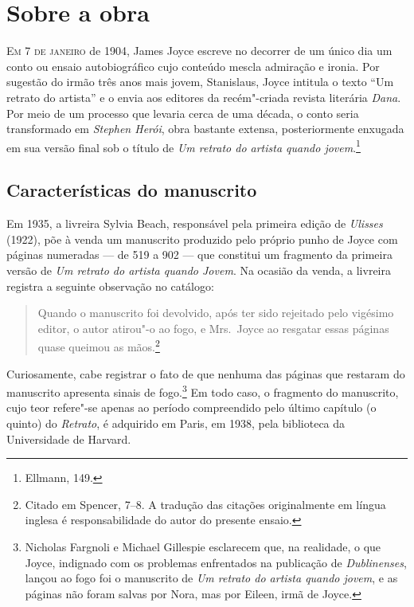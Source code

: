 \section{Sobre a obra}

\textsc{Em 7 de janeiro} de 1904, James Joyce escreve no decorrer de um único dia
um conto ou ensaio autobiográfico cujo conteúdo mescla admiração e
ironia.  Por sugestão do irmão três anos mais jovem, Stanislaus, Joyce
intitula o texto “Um retrato do artista” e o envia aos editores da
recém"-criada revista literária \textit{Dana}.  Por meio de um processo
que levaria  cerca de uma década, o conto seria transformado em
\textit{Stephen Herói}, obra bastante extensa, posteriormente enxugada
em sua versão final sob o título de \textit{Um retrato do artista
quando jovem}.\footnote{ Ellmann, 149.}		


\subsection*{Características do manuscrito}

Em 1935, a livreira Sylvia Beach, responsável pela primeira edição de
\textit{Ulisses} (1922), põe à venda um manuscrito produzido pelo
próprio punho de Joyce com páginas numeradas --- de 519 a 902 --- que
constitui um fragmento da primeira versão de \textit{Um retrato do
artista quando Jovem}.  Na ocasião da venda, a livreira registra a
seguinte observação no catálogo: 

\begin{quote}
Quando o manuscrito foi devolvido,
após ter sido rejeitado pelo vigésimo editor, o autor atirou"-o ao fogo,
e Mrs.~Joyce ao resgatar essas páginas quase queimou as mãos.\footnote{
Citado em Spencer, 7--8. A tradução das citações originalmente em
língua inglesa é responsabilidade do autor do presente ensaio.} 
\end{quote}

Curiosamente, cabe registrar o fato de que nenhuma das páginas que
restaram do manuscrito apresenta sinais de fogo.\footnote{ Nicholas Fargnoli e Michael Gillespie 
esclarecem que, na realidade, o que Joyce, indignado com os problemas enfrentados na publicação 
de \textit{Dublinenses}, lançou ao fogo foi o manuscrito de \textit{Um retrato do artista quando jovem}, 
e as páginas não foram salvas por Nora, mas por Eileen, irmã de Joyce.}  Em todo caso, o
fragmento do manuscrito, cujo teor refere"-se apenas ao período
compreendido pelo último capítulo (o quinto) do \textit{Retrato}, é
adquirido em Paris, em 1938, pela biblioteca da Universidade de
Harvard.

